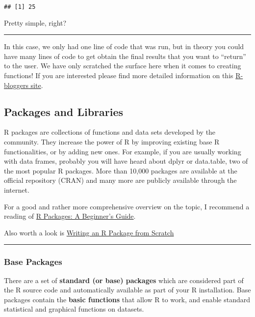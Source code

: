 \documentclass[
]{article}
\begin{document}
\begin{verbatim}
## [1] 25
\end{verbatim}

Pretty simple, right?

\begin{center}\rule{0.5\linewidth}{0.5pt}\end{center}

In this case, we only had one line of code that was run, but in theory
you could have many lines of code to get obtain the final results that
you want to ``return'' to the user. We have only scratched the surface
here when it comes to creating functions! If you are interested please
find more detailed information on this
\href{https://www.r-bloggers.com/how-to-write-and-debug-an-r-function/}{R-bloggers
site}.

\hypertarget{packages-and-libraries}{%
\subsection{Packages and Libraries}\label{packages-and-libraries}}

R packages are collections of functions and data sets developed by the
community. They increase the power of R by improving existing base R
functionalities, or by adding new ones. For example, if you are usually
working with data frames, probably you will have heard about dplyr or
data.table, two of the most popular R packages. More than 10,000
packages are available at the official repository (CRAN) and many more
are publicly available through the internet.

For a good and rather more comprehensive overview on the topic, I
recommend a reading of
\href{https://www.datacamp.com/community/tutorials/r-packages-guide}{R
Packages: A Beginner's Guide}.

Also worth a look is
\href{https://hilaryparker.com/2014/04/29/writing-an-r-package-from-scratch/}{Writing
an R Package from Scratch}

\begin{center}\rule{0.5\linewidth}{0.5pt}\end{center}

\hypertarget{base-packages}{%
\subsubsection{Base Packages}\label{base-packages}}

There are a set of \textbf{standard (or base) packages} which are
considered part of the R source code and automatically available as part
of your R installation. Base packages contain the \textbf{basic
functions} that allow R to work, and enable standard statistical and
graphical functions on datasets.
\end{document}
